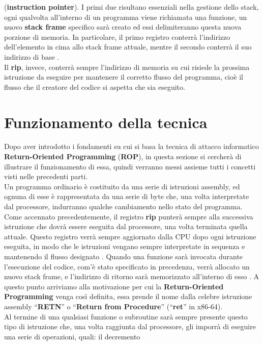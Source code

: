 (\textbf{instruction pointer}).
I primi due risultano essenziali nella gestione dello stack, ogni qualvolta all'interno di un programma viene richiamata una funzione, un nuovo \textbf{stack frame} specifico sarà creato ed 
essi delimiteranno questa nuova porzione di memoria.
In particolare, il primo registro conterrà l'indirizzo dell'elemento in cima allo stack frame attuale, mentre il secondo conterrà il suo indirizzo di base \cite*{stack-frame-layoutx86-64}.\\
Il \textbf{rip}, invece, conterrà sempre l'indirizzo di memoria su cui risiede la prossima istruzione da eseguire per mantenere il corretto
flusso del programma, cioè il flusso che il creatore del codice si aspetta che sia eseguito.

\section{Funzionamento della tecnica}
\label{sec:func}
Dopo aver introdotto i fondamenti su cui si basa la tecnica di attacco informatico \textbf{Return-Oriented Programming} (\textbf{ROP}), in questa sezione si cercherà di illustrare il 
funzionamento di essa, quindi verranno messi assieme tutti i concetti visti nelle precedenti parti.\\
Un programma ordinario è costituito da una serie di istruzioni assembly, ed ognuna di esse è rappresentata da una serie di byte che, una volta interpretate dal processore, indurranno qualche cambiamento
nello stato del programma. Come accennato precedentemente, il registro \textbf{rip} punterà sempre alla successiva istruzione che dovrà essere eseguita dal processore, una volta terminata quella 
attuale. Questo registro verrà sempre aggiornato dalla CPU dopo ogni istruzione eseguita, in modo che le istruzioni vengano sempre interpretate in sequenza e 
mantenendo il flusso designato \cite*{ROP-General}.
Quando una funzione sarà invocata durante l'esecuzione del codice, com'è stato specificato in precedenza, verrà allocato un nuovo stack frame, e l'indirizzo di ritorno sarà memorizzato 
all'interno di esso \cite*{buffer-overflow}. A questo punto arriviamo alla motivazione per cui la \textbf{Return-Oriented Programming} venga così definita, essa prende il nome dalla celebre istruzione assembly ``\textbf{RETN}'' o
``\textbf{Return from Procedure}'' (``\textbf{ret}'' in x86-64).\\
Al termine di una qualsiasi funzione o subroutine sarà sempre presente questo tipo di istruzione che, una volta raggiunta dal processore, gli imporrà di eseguire una serie di operazioni, quali: il decremento
